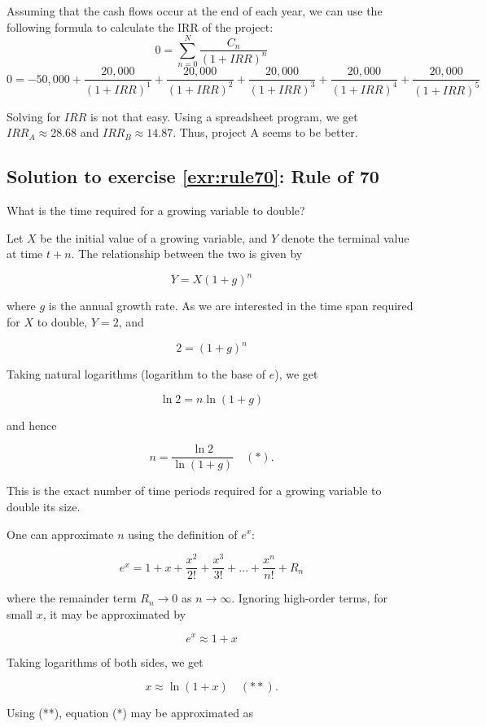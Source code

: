 \documentclass[
  12pt,
  oneside]{book}
\theoremstyle{definition}
\theoremstyle{definition}
\theoremstyle{definition}
\theoremstyle{definition}
\theoremstyle{remark}
\begin{document}
Assuming that the cash flows occur at the end of each year, we can use the following formula to calculate the IRR of the project:
\[ 0 = \sum_{n=0}^{N} \frac{C_n}{(1+IRR)^n}  \]
\[
0 = -50,000 + 
\frac{20,000}{(1 + IRR)^1} 
+ \frac{20,000 }{ (1 + IRR)^2 }
+ \frac{20,000 }{ (1 + IRR)^3 }
+ \frac{20,000 }{ (1 + IRR)^4 }
+ \frac{20,000 }{ (1 + IRR)^5 }
\]

Solving for \(IRR\) is not that easy. Using a spreadsheet program, we get \(IRR_A\approx 28.68%
\) and \(IRR_B\approx 14.87%
\). Thus, project A seems to be better.

\hypertarget{sol:rule70}{%
\subsection*{Solution to exercise \ref{exr:rule70}: Rule of 70}\label{sol:rule70}}

What is the time required for a growing variable to double?

Let \(X\) be the initial value of a growing variable, and \(Y\) denote the terminal value at time \(t + n\). The relationship between the two is given by

\[Y = X(1+g)^n\]

where \(g\) is the annual growth rate. As we are interested in the time span required for \(X\) to double, \(Y = 2\), and

\[2 = (1+g)^n\]

Taking natural logarithms (logarithm to the base of \(e\)), we get

\[\ln 2 = n \ln (1+g)\]

and hence

\[n = \frac{\ln 2}{\ln (1+g)} \quad (*).\]

This is the exact number of time periods required for a growing variable to double its size.

One can approximate \(n\) using the definition of \(e^x\):

\[e^x = 1 + x + \frac{x^2}{2!} + \frac{x^3}{3!} + \ldots + \frac{x^n}{n!} + R_n\]

where the remainder term \(R_n \rightarrow 0\) as \(n \rightarrow \infty\). Ignoring high-order terms, for small \(x\), it may be approximated by

\[e^x \approx 1 + x\]

Taking logarithms of both sides, we get

\[x \approx \ln (1 + x) \quad (**).\]

Using (**), equation (*) may be approximated as
\end{document}
